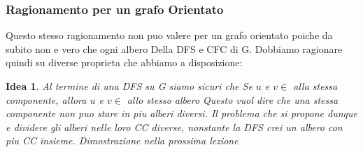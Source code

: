 \subsubsection{Ragionamento per un grafo Orientato}
Questo stesso ragionamento non puo valere per un grafo orientato poiche da subito non e vero che ogni albero Della DFS e CFC di G.
Dobbiamo ragionare quindi su diverse proprieta che abbiamo a disposizione:
\newtheorem{ideaorientato}{Idea}
\begin{ideaorientato}
	\item Al termine di una DFS su G siamo sicuri che 
		\subitem Se $u$ e $v \in$ alla stessa componente, allora $u$ e $v \in$  allo stesso albero
		Questo vuol dire che una stessa componente non puo stare in piu alberi diversi. Il problema che si propone dunque e dividere gli alberi nelle loro CC diverse, nonstante la DFS crei un albero con piu CC insieme.
		Dimostrazione nella prossima lezione
\end{ideaorientato}


